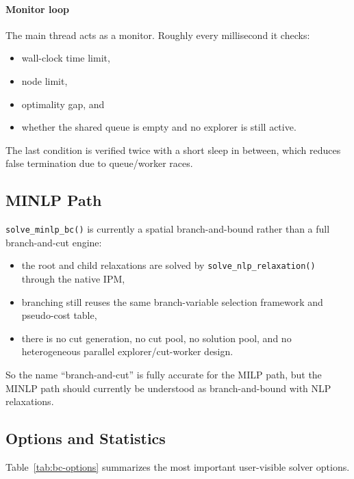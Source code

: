 \paragraph{Monitor loop}
The main thread acts as a monitor. Roughly every millisecond it checks:
\begin{itemize}
  \item wall-clock time limit,
  \item node limit,
  \item optimality gap, and
  \item whether the shared queue is empty and no explorer is still active.
\end{itemize}

The last condition is verified twice with a short sleep in between, which reduces false termination due to queue/worker races.

\subsection{MINLP Path}

\texttt{solve\_minlp\_bc()} is currently a spatial branch-and-bound rather than a full branch-and-cut engine:
\begin{itemize}
  \item the root and child relaxations are solved by \texttt{solve\_nlp\_relaxation()} through the native IPM,
  \item branching still reuses the same branch-variable selection framework and pseudo-cost table,
  \item there is no cut generation, no cut pool, no solution pool, and no heterogeneous parallel explorer/cut-worker design.
\end{itemize}

So the name ``branch-and-cut'' is fully accurate for the MILP path, but the MINLP path should currently be understood as branch-and-bound with NLP relaxations.

\subsection{Options and Statistics}

Table~\ref{tab:bc-options} summarizes the most important user-visible solver options.

